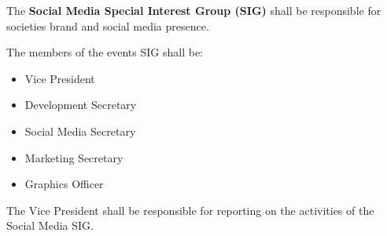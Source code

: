 \begin{clause}
    The \textbf{Social Media Special Interest Group (SIG)} shall be responsible for societies brand and social media presence.
\end{clause}

\begin{subclause}
    The members of the events SIG shall be:
    \begin{itemize}[label=--,topsep=0em,itemsep=0em]
        \item Vice President
        \item Development Secretary
        \item Social Media Secretary
        \item Marketing Secretary
        \item Graphics Officer
    \end{itemize}
\end{subclause}

\begin{subclause}
    The Vice President shall be responsible for reporting on the activities of the Social Media SIG.
\end{subclause}